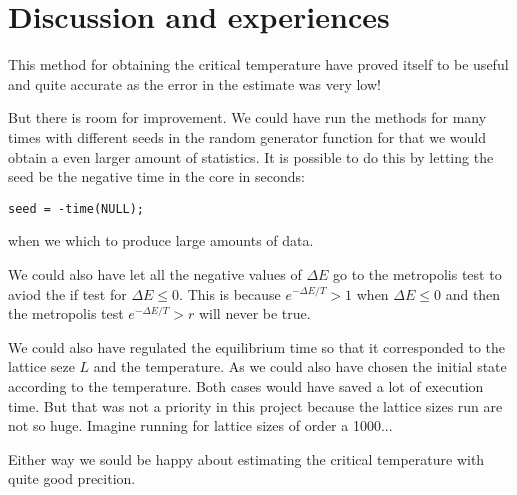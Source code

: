 \documentclass[11pt,a4wide]{article}
\begin{document}
\section{Discussion and experiences}

This method for obtaining the critical temperature have proved itself to be useful and quite accurate as the error in the estimate was very low! 

But there is room for improvement. We could have run the methods for many times with different seeds in the random generator function for that we would obtain a even larger amount of statistics. It is possible to do this by letting the seed be the negative time in the core in seconds:
\begin{lstlisting}
seed = -time(NULL);
\end{lstlisting}
when we which to produce large amounts of data. 

We could also have let all the negative values of $\Delta E$ go to the metropolis test to aviod the if test for $\Delta E\leq 0$. This is because $e^{-\Delta E/T} > 1$ when $\Delta E\leq 0$ and then the metropolis test $e^{-\Delta E/T} > r$ will never be true. 

We could also have regulated the equilibrium time so that it corresponded to the lattice seze $L$ and the temperature. As we could also have chosen the initial state according to the temperature. Both cases would have saved a lot of execution time. But that was not a priority in this project because the lattice sizes run are not so huge. Imagine running for lattice sizes of order a 1000...

Either way we sould be happy about estimating the critical temperature with quite good precition.
\end{document}
